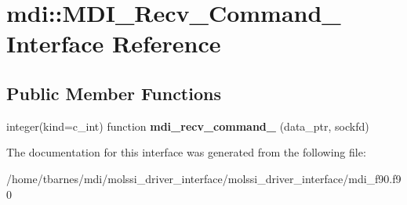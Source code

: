 \hypertarget{interfacemdi_1_1MDI__Recv__Command__}{\section{mdi\-:\-:M\-D\-I\-\_\-\-Recv\-\_\-\-Command\-\_\- Interface Reference}
\label{interfacemdi_1_1MDI__Recv__Command__}
}
\subsection*{Public Member Functions}
\begin{DoxyCompactItemize}
\item 
\hypertarget{interfacemdi_1_1MDI__Recv__Command___aa0c9c851eb4b1bb5f50036cab2ab2be4}{integer(kind=c\-\_\-int) function {\bfseries mdi\-\_\-recv\-\_\-command\-\_\-} (data\-\_\-ptr, sockfd)}\label{interfacemdi_1_1MDI__Recv__Command___aa0c9c851eb4b1bb5f50036cab2ab2be4}

\end{DoxyCompactItemize}


The documentation for this interface was generated from the following file\-:\begin{DoxyCompactItemize}
\item 
/home/tbarnes/mdi/molssi\-\_\-driver\-\_\-interface/molssi\-\_\-driver\-\_\-interface/mdi\-\_\-f90.\-f90\end{DoxyCompactItemize}
